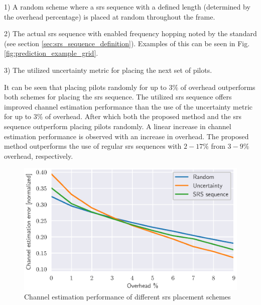 1) A random scheme where a \gls{srs} sequence with a defined length (determined by the overhead percentage) is placed at random throughout the frame. 

2) The actual \gls{srs} sequence with enabled frequency hopping noted by the standard (see section \ref{sec:srs_sequence_definition}). Examples of this can be seen in Fig. \ref{fig:prediction_example_grid}. 

3) The utilized uncertainty metric for placing the next set of pilots.

It can be seen that placing pilots randomly for up to $3\%$ of overhead outperforms both schemes for placing the \gls{srs} sequence. The utilized \gls{srs} sequence offers improved channel estimation performance than the use of the uncertainty metric for up to $3\%$ of overhead. After which both the proposed method and the \gls{srs} sequence outperform placing pilots randomly. A linear increase in channel estimation performance is observed with an increase in overhead. The proposed method outperforms the use of regular \gls{srs} sequences with $2-17\%$ from $3-9\%$ overhead, respectively.

\begin{figure}
    \centering
    \includegraphics{chapters/part_uplink/figures/results/channel_estimation/overhead_comparison_scheme.eps}
    \caption{Channel estimation performance of different \gls{srs} placement schemes}
    \label{fig:overhead_channel_estimation}
\end{figure}


